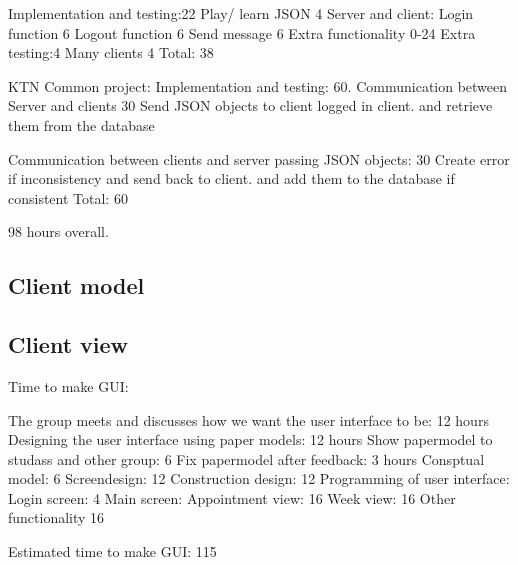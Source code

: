 \documentclass[a4paper, english, 12pt]{article}
\begin{document}
Implementation and testing:22
	Play/ learn JSON 4
	Server and client:
		Login function 6
		Logout function 6
		Send message 6
	Extra functionality 0-24
Extra testing:4
	Many clients 4
Total: 38

KTN Common project:
Implementation and testing: 60.
	Communication between Server and clients 30
		Send JSON objects to client logged in client. 
        and retrieve them from the database
		
	Communication between clients and server passing JSON objects: 30
		Create error if inconsistency and send back to client. 
        and add them to the database if consistent
Total: 60

98 hours overall. 
\subsection{Client model}

\subsection{Client view}
Time to make GUI:

The group meets and discusses how we want the user interface to be: 12 hours
Designing the user interface using paper models: 12 hours
Show papermodel to studass and other group: 6
Fix papermodel after feedback: 3 hours
Consptual model: 6
Screendesign: 12
Construction design: 12
	Programming of user interface: 
	Login screen: 4
	Main screen:
		Appointment view: 16
		Week view: 16
		Other functionality 16

Estimated time to make GUI: 115
\end{document}
